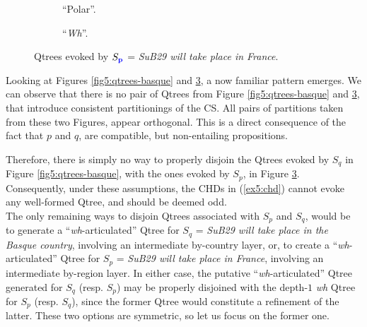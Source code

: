 \begin{figure}[H]
	\centering
	\begin{subfigure}[b]{.45\linewidth}
		\centering
		\caption[]{``Polar''.}\label{fig5:qtree-france-polar-r}
	\end{subfigure}\hfill
	\begin{subfigure}[b]{.45\linewidth}
		\centering
		\caption[]{``\textit{Wh}''.}\label{fig5:qtree-france-wh-r}
	\end{subfigure}
	\caption[]{Qtrees evoked by $S_{\textbf{\textcolor{blue}{p}}}$ = \textit{SuB29 will take place in France}.}\label{fig5:qtrees-france-r}
\end{figure}

Looking at Figures \ref{fig5:qtrees-basque} and \ref{fig5:qtrees-france-r}, a now familiar pattern emerges. We can observe that there is no pair of Qtrees from Figure \ref{fig5:qtrees-basque} and \ref{fig5:qtrees-france-r}, that introduce consistent partitionings of the CS. All pairs of partitions taken from these two Figures, appear orthogonal. This is a direct consequence of the fact that $p$ and $q$, are compatible, but non-entailing propositions.

Therefore, there is simply no way to properly disjoin the Qtrees evoked by $S_{q}$ in Figure \ref{fig5:qtrees-basque}, with the ones evoked by $S_p$, in Figure \ref{fig5:qtrees-france-r}. Consequently, under these assumptions, the CHDs in (\ref{ex5:chd}) cannot evoke any well-formed Qtree, and should be deemed odd.\\


The only remaining ways to disjoin Qtrees associated with $S_p$ and $S_q$, would be to generate a ``\textit{wh}-articulated'' Qtree for $S_q$ = \textit{SuB29 will take place in the Basque country}, involving an intermediate by-country layer, or, to create a ``\textit{wh}-articulated'' Qtree for $S_p$ = \textit{SuB29 will take place in France}, involving an intermediate by-region layer. In either case, the putative ``\textit{wh}-articulated'' Qtree generated for $S_q$ (resp. $S_p$) may be properly disjoined with the depth-$1$ \textit{wh} Qtree for $S_p$ (resp. $S_q$), since the former Qtree would constitute a refinement of the latter. These two options are symmetric, so let us focus on the former one.\\ 


